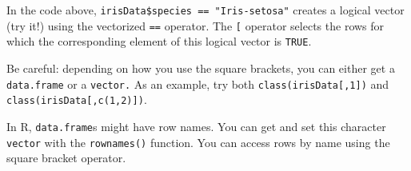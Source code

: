 \documentclass[
  12pt,
  krantz2]{krantz}
\makeatletter
\newenvironment{Shaded}{\begin{snugshade}}{\end{snugshade}}
\newcommand{\CommentTok}[1]{\textcolor[rgb]{0.37,0.37,0.37}{\textit{#1}}}
\newcommand{\DecValTok}[1]{\textcolor[rgb]{0.06,0.06,0.06}{#1}}
\newcommand{\DocumentationTok}[1]{\textcolor[rgb]{0.37,0.37,0.37}{\textbf{\textit{#1}}}}
\newcommand{\NormalTok}[1]{#1}
\newcommand{\OtherTok}[1]{\textcolor[rgb]{0.37,0.37,0.37}{#1}}
\newcommand{\SpecialCharTok}[1]{\textcolor[rgb]{0,0,0}{#1}}
\newcommand{\StringTok}[1]{\textcolor[rgb]{0.5,0.5,0.5}{#1}}
\newenvironment{kframe}{%
\medskip{}
\setlength{\fboxsep}{.8em}
 \def\at@end@of@kframe{}%
 \ifinner\ifhmode%
  \def\at@end@of@kframe{\end{minipage}}%
  \begin{minipage}{\columnwidth}%
 \fi\fi%
 \def\FrameCommand##1{\hskip\@totalleftmargin \hskip-\fboxsep
 \colorbox{shadecolor}{##1}\hskip-\fboxsep
     \hskip-\linewidth \hskip-\@totalleftmargin \hskip\columnwidth}%
 \MakeFramed {\advance\hsize-\width
   \@totalleftmargin\z@ \linewidth\hsize
   \@setminipage}}%
 {\par\unskip\endMakeFramed%
 \at@end@of@kframe}
\renewenvironment{Shaded}{\begin{kframe}}{\end{kframe}}
\makeatother
\begin{document}
\begin{Shaded}
\end{Shaded}

In the code above, \texttt{irisData\$species\ ==\ "Iris-setosa"} creates a logical vector (try it!) using the vectorized \texttt{==} operator. The \texttt{{[}} operator selects the rows for which the corresponding element of this logical vector is \texttt{TRUE}.

\begin{rmd-details}
Be careful: depending on how you use the square brackets, you can either get a \texttt{data.frame} or a \texttt{vector.} As an example, try both \texttt{class(irisData{[},1{]})} and \texttt{class(irisData{[},c(1,2){]})}.

\end{rmd-details}

In R, \texttt{data.frame}s might have row names. You can get and set this character \texttt{vector} with the \texttt{rownames()} function. You can access rows by name using the square bracket operator.
\end{document}
